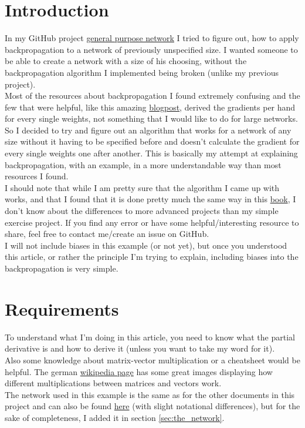 \documentclass[11pt, halfparskip]{article}
\begin{document}
    \section{Introduction}
    \label{sec:introduction}
	In my GitHub project \href{https://github.com/LinusSee/learning-ai/tree/master/first-steps/general_purpose_network}{general purpose network} I tried to figure out, how to apply
	backpropagation to a network of previously unspecified size. I wanted someone to be able to create a network with a size of his choosing, without the backpropagation algorithm I
	implemented being broken (unlike my previous project).\\
	Most of the resources about backpropagation I found extremely confusing and the few that were helpful, like this amazing \href{https://mattmazur.com/2015/03/17/a-step-by-step-backpropagation-example/}{blogpost}, derived the gradients per hand for every single weights, not something that I would like to do for large networks.\\
	So I decided to try and figure out an algorithm that works for a network of any size without it having to be specified before and doesn't calculate the gradient for every single weights
	one after another. This is basically my attempt at explaining backpropagation, with an example, in a more understandable way than most resources I found.\\
	I should note that while I am pretty sure that the algorithm I came up with works, and that I found that it is done pretty much the same way in this 
	\href{http://neuralnetworksanddeeplearning.com/chap1.html}{book}, I don't know about the differences to more advanced projects than my simple exercise project. If you find any
	error or have some helpful/interesting resource to share, feel free to contact me/create an issue on GitHub.\\
	I will not include biases in this example (or not yet), but once you understood this article, or rather the principle I'm trying to explain, including biases into the backpropagation is
	very simple.
    
    \section{Requirements}
    \label{sec:requirements}
    	To understand what I'm doing in this article, you need to know what the partial derivative is and how to derive it (unless you want to take my word for it).\\
    	Also some knowledge about matrix-vector multiplication or a cheatsheet would be helpful. The german \href{https://de.wikipedia.org/wiki/Matrizenmultiplikation}{wikipedia page}
    	has some great images displaying how different multiplications between matrices and vectors work.\\
   	The network used in this example is the same as for the other documents in this project and can also be found 
    	\href{https://github.com/LinusSee/learning-ai/blob/master/first-steps/general_purpose_network/assets/latex/example_network/diagram/2-4-3-2_network.pdf}{here} 
    	(with slight notational differences), but for the sake of completeness, I added it in section \ref{sec:the_network}.
    
\end{document}
